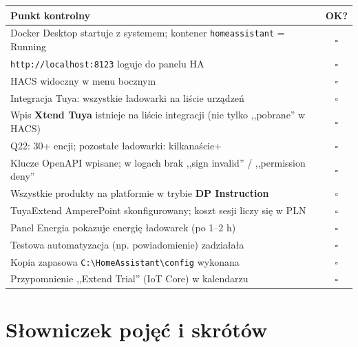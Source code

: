 \documentclass[11pt,a4paper]{article}
\begin{document}
\begin{center}
\begin{tabular}{>{\raggedright\arraybackslash}p{11.2cm} c}
\toprule
\textbf{Punkt kontrolny} & \textbf{OK?}\\
\midrule
Docker Desktop startuje z systemem; kontener \texttt{homeassistant} = Running & $\square$\\
\texttt{http://localhost:8123} loguje do panelu HA & $\square$\\
HACS widoczny w menu bocznym & $\square$\\
Integracja Tuya: wszystkie ładowarki na liście urządzeń & $\square$\\
Wpis \textbf{Xtend Tuya} istnieje na liście integracji (nie tylko ,,pobrane'' w HACS) & $\square$\\
Q22: 30+ encji; pozostałe ładowarki: kilkanaście+ & $\square$\\
Klucze OpenAPI wpisane; w logach brak ,,sign invalid'' / ,,permission deny'' & $\square$\\
Wszystkie produkty na platformie w trybie \textbf{DP Instruction} & $\square$\\
TuyaExtend AmperePoint skonfigurowany; koszt sesji liczy się w PLN & $\square$\\
Panel Energia pokazuje energię ładowarek (po 1--2 h) & $\square$\\
Testowa automatyzacja (np. powiadomienie) zadziałała & $\square$\\
Kopia zapasowa \texttt{C:\textbackslash HomeAssistant\textbackslash config} wykonana & $\square$\\
Przypomnienie ,,Extend Trial'' (IoT Core) w kalendarzu & $\square$\\
\bottomrule
\end{tabular}
\end{center}

\section{Słowniczek pojęć i skrótów}
\label{sec:slowniczek}
\end{document}

